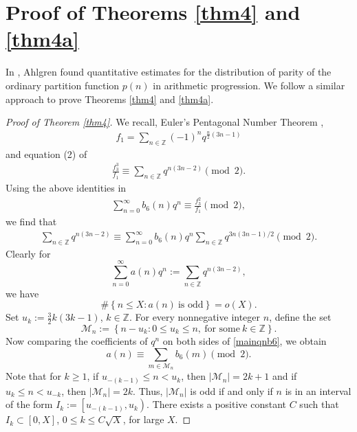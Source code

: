 \documentclass[reqno]{amsart}
\theoremstyle{definition}
\theoremstyle{remark}
\numberwithin{equation}{section}
\begin{document}
\section{Proof of Theorems \ref{thm4} and \ref{thm4a}} 
In \cite{ahlgren}, Ahlgren found quantitative estimates for the distribution of parity of the ordinary partition function $p(n)$ in arithmetic progression. We follow a similar approach to prove Theorems \ref{thm4} and \ref{thm4a}.
\begin{proof}[Proof of Theorem \ref{thm4}] 
We recall, Euler's Pentagonal Number Theorem \cite[(1.3.18)]{berndt},
\begin{align}\label{Pentagonal}
f_1=\sum_{n\in \mathbb{Z}}^{}(-1)^{n}q^{\frac{n}{2}(3n-1)}
\end{align}
and equation (2) of \cite{Keith2021}
\begin{align*}
\frac{f^{3}_{3}}{f_1}\equiv \sum_{n\in \mathbb{Z}}^{}q^{n(3n-2)} \pmod{2}.
\end{align*}
Using the above identities in
\begin{align*}
\sum_{n=0}^{\infty}b_6(n)q^{n}\equiv \frac{f^{2}_{3}}{f_{1}}\pmod{2},
\end{align*}
we find that 
\begin{align}\label{mainqnb6}
\sum_{n\in \mathbb{Z}}^{}q^{n(3n-2)}\equiv\sum_{n=0}^{\infty}b_6(n)q^{n}\sum_{n\in \mathbb{Z}}q^{3n(3n-1)/2}\pmod{2}.
\end{align}
Clearly for
\begin{equation*}
\sum_{n=0}^{\infty}a(n)q^{n}:=\sum_{n\in \mathbb{Z}}^{}q^{n(3n-2)},
\end{equation*}
we have
\begin{equation}\label{b6ox}
\#\left\lbrace n\leq X : a(n)\ \text{is odd}\right\rbrace=o(X).
\end{equation}
Set $u_k:=\frac{3}{2}k(3k-1)$, $k\in \mathbb{Z}$. For every nonnegative integer $n$, define the set
\begin{equation*}
\mathcal{M}_{n}:=\left\lbrace n-u_k:0\leq u_k\leq n,\ \text{for some}\ k\in \mathbb{Z} \right\rbrace.
\end{equation*}
Now comparing the coefficients of $q^{n}$ on both sides of \eqref{mainqnb6}, we obtain
\begin{equation}\label{mainproofb6}
a(n)\equiv\sum_{m\in\mathcal{M}_n}b_6(m) \pmod{2}.
\end{equation}
Note that for $k\geq1$, if $u_{-(k-1)}\leq n< u_k$, then $|\mathcal{M}_n|=2k+1$ and if $u_{k}\leq n< u_{-k}$, then $|\mathcal{M}_n|=2k$. 
Thus, $|\mathcal{M}_n|$ is odd if and only if $n$ is in an interval of the form $I_{k}:=\left[u_{-(k-1)},u_{k}\right)$. There exists a positive constant $C$ such that $I_{k}\subset\left[0,X \right] $, $0\leq k\leq C\sqrt{X}$, for large $X$. 

\end{proof}
\end{document}
